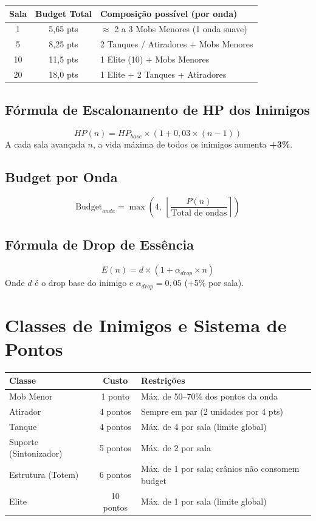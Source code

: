 \documentclass[a4paper,12pt]{report}
\begin{document}
\begin{center}
\begin{tabular}{|c|c|l|}
    \hline
    \textbf{Sala} & \textbf{Budget Total} & \textbf{Composição possível (por onda)} \\
    \hline
    1  & 5,65 pts & $\approx$ 2 a 3 Mobs Menores (1 onda suave) \\
    5  & 8,25 pts & 2 Tanques / Atiradores + Mobs Menores \\
    10 & 11,5 pts & 1 Elite (10) + Mobs Menores \\
    20 & 18,0 pts & 1 Elite + 2 Tanques + Atiradores \\
    \hline
\end{tabular}
\end{center}

\subsection{Fórmula de Escalonamento de HP dos Inimigos}
\[
HP(n) = HP_{base} \times (1 + 0{,}03 \times (n - 1))
\]
A cada sala avançada $n$, a vida máxima de todos os inimigos aumenta \textbf{+3\%}.

\subsection{Budget por Onda}
\[
\text{Budget}_{onda} = \max\!\left(4,\ \left\lfloor \frac{P(n)}{\text{Total de ondas}} \right\rceil \right)
\]

\subsection{Fórmula de Drop de Essência}
\[
E(n) = d \times (1 + \alpha_{drop} \times n)
\]
Onde $d$ é o drop base do inimigo e $\alpha_{drop} = 0{,}05$ (+5\% por sala).

\section{Classes de Inimigos e Sistema de Pontos}
\begin{center}
\begin{tabular}{|l|c|l|}
    \hline
    \textbf{Classe} & \textbf{Custo} & \textbf{Restrições} \\
    \hline
    Mob Menor              & 1 ponto   & Máx. de 50--70\% dos pontos da onda \\
    Atirador               & 4 pontos  & Sempre em par (2 unidades por 4 pts) \\
    Tanque                 & 4 pontos  & Máx. de 4 por sala (limite global) \\
    Suporte (Sintonizador) & 5 pontos  & Máx. de 2 por sala \\
    Estrutura (Totem)      & 6 pontos  & Máx. de 1 por sala; crânios não consomem budget \\
    Elite                  & 10 pontos & Máx. de 1 por sala (limite global) \\
    \hline
\end{tabular}
\end{center}
\end{document}
